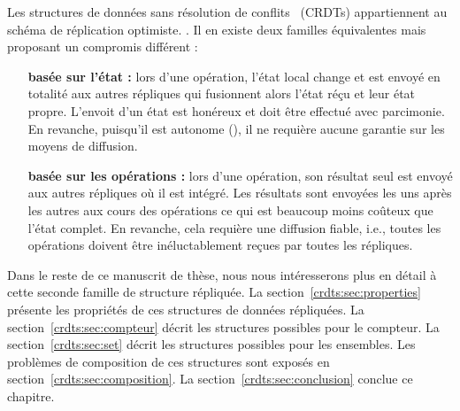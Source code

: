 Les structures de données sans résolution de
conflits~\cite{shapiro2011comprehensive} (CRDTs) appartiennent au schéma de
réplication optimiste. .  Il en existe deux
familles équivalentes mais proposant un compromis différent :
\begin{itemize}
\item [\textbf{basée sur l'état :}] lors d'une opération, l'état local change et
  est envoyé en totalité aux autres répliques qui fusionnent alors l'état réçu
  et leur état propre. L'envoit d'un état est honéreux et doit être effectué
  avec parcimonie. En revanche, puisqu'il est autonome
  (), il ne requière aucune garantie sur les moyens
  de diffusion.
\item [\textbf{basée sur les opérations :}] lors d'une opération, son résultat
  seul est envoyé aux autres répliques où il est intégré. Les résultats sont
  envoyées les uns après les autres aux cours des opérations ce qui est beaucoup
  moins coûteux que l'état complet. En revanche, cela requière une diffusion
  fiable, i.e., toutes les opérations doivent être inéluctablement reçues par
  toutes les répliques.
\end{itemize}

Dans le reste de ce manuscrit de thèse, nous nous intéresserons plus en détail à
cette seconde famille de structure répliquée. La
section~\ref{crdts:sec:properties} présente les propriétés de ces structures de
données répliquées. La section~\ref{crdts:sec:compteur} décrit les structures
possibles pour le compteur. La section~\ref{crdts:sec:set} décrit les structures
possibles pour les ensembles. Les problèmes de composition de ces structures
sont exposés en section~\ref{crdts:sec:composition}. La
section~\ref{crdts:sec:conclusion} conclue ce chapitre.
